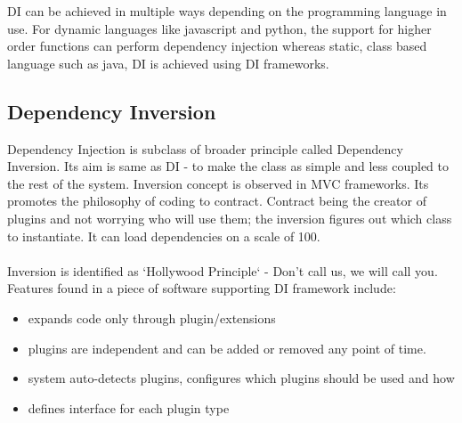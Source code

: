 \noindent
DI can be achieved in multiple ways depending on the programming language in use. For dynamic languages
like javascript and python, the support for higher order functions can perform dependency injection
whereas static, class based language such as java, DI is achieved using DI frameworks.

\pagebreak

\subsection{Dependency Inversion}
Dependency Injection is subclass of broader principle called Dependency Inversion. Its aim is same as
DI - to make the class as simple and less coupled to the rest of the system. Inversion concept is observed
in MVC frameworks. Its promotes the philosophy of coding to contract. Contract being the creator of plugins
and not worrying who will use them; the inversion figures out which class to instantiate. It can load
dependencies on a scale of 100.
\\
\\
\noindent
Inversion is identified as `Hollywood Principle` - Don't call us, we will call you. Features found in a
piece of software supporting DI framework include:
\begin{itemize}
  \item expands code only through plugin/extensions
  \item plugins are independent and can be added or removed any point of time.
  \item system auto-detects plugins, configures which plugins should be used and how
  \item defines interface for each plugin type
\end{itemize}


\pagebreak

